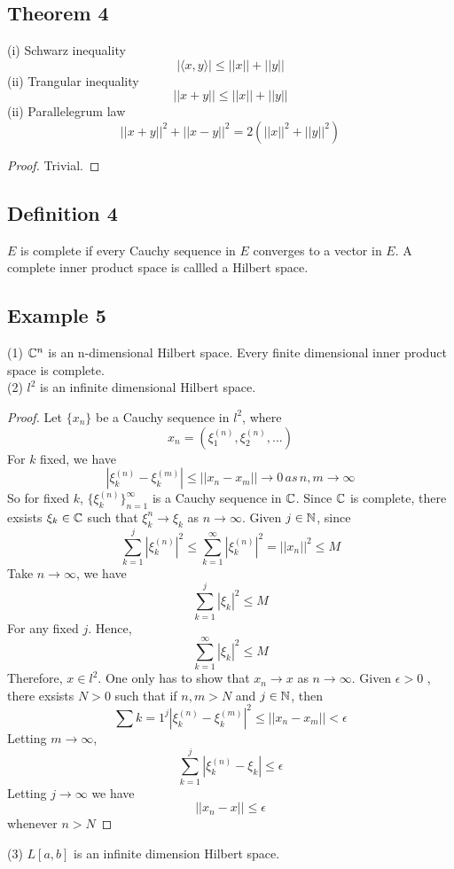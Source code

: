 \documentclass{article}
\begin{document}
\subsection*{Theorem 4}
(i) Schwarz inequality
\[
|\langle x,y\rangle| \leq ||x|| + ||y|| 
\]
(ii) Trangular inequality
\[ 
||x+y|| \leq ||x|| + ||y||
\] 
(ii) Parallelegrum law
\[
||x+y||^2+||x-y||^2=2(||x||^2+||y||^2)
\]
%
\begin{proof}
Trivial.
\end{proof}

\subsection*{ Definition 4}
$E$ is  complete if every Cauchy sequence in $E$ converges to a vector in $E$. A complete inner product space is callled a Hilbert space.

\subsection*{ Example 5}
(1) $\Bbb{C}^n$ is an n-dimensional Hilbert space. Every finite dimensional inner product space is complete.\\
(2) $l^2$ is an infinite dimensional Hilbert space.
\begin{proof}
Let $\{x_n\}$ be a Cauchy sequence in $l^2$, where
\[
x_n=(\xi_{1}^{(n)}, \xi_{2}^{(n)}, ...)
\]
For $k$ fixed, we have 
\[
|\xi_{k}^{(n)}-\xi_{k}^{(m)}| \leq || x_n-x_m|| \rightarrow 0\, as \, n,m \rightarrow \infty
\]
So for fixed $k$, $\{\xi_{k}^{(n)}\}_{n=1}^{\infty}$ is a Cauchy sequence in $\Bbb{C}$. Since $\Bbb{C}$ is complete, there exsists $\xi_k\in \Bbb{C}$ such that $\xi_{k}^{n}\rightarrow\xi_{k}$ as $n\rightarrow\infty$.
Given $j\in \Bbb{N}$, since
\[
\sum_{k=1}^{j}|\xi_{k}^{(n)}|^2 \leq\sum_{k=1}^{\infty}|\xi_{k}^{(n)}|^2  = ||x_n||^2 \leq M
\]
Take $n \to \infty$, we have
\[
\sum_{k=1}^{j} |\xi_{k}|^2 \leq M
\]
For any fixed $j$. Hence, 
\[
\sum_{k=1}^{\infty}|\xi_k|^2\leq M
\]
Therefore, $x \in l^2$. One only has to show that $x_n \to x$ as $n \to \infty$. Given $\epsilon > 0$ , there exsists $N>0$ such that if $n,m>N$ and $j\in \Bbb{N}$, then 
\[
\sum{k=1}^{j}|\xi_k^(n)-\xi_k^(m)|^2 \leq ||x_n-x_m|| <\epsilon
\]
Letting $m \rightarrow \infty$,
\[
\sum_{k=1}^{j}|\xi_k^(n)-\xi_k|\leq\epsilon
\]
Letting $j \rightarrow \infty$ we have
\[
||x_n-x||\leq\epsilon
\]
whenever $n>N$

\end{proof}

(3) $L[a,b]$ is an infinite dimension Hilbert space.\\
\end{document}
